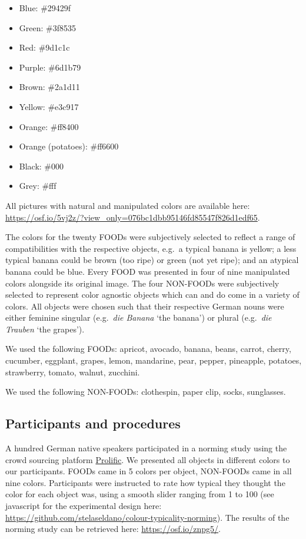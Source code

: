 \documentclass[
  12pt,
]{article}
\providecommand{\tightlist}{%
  \setlength{\itemsep}{0pt}\setlength{\parskip}{0pt}}
\begin{document}
\begin{itemize}
\tightlist
\item
  Blue: \#29429f
\item
  Green: \#3f8535
\item
  Red: \#9d1c1c
\item
  Purple: \#6d1b79
\item
  Brown: \#2a1d11
\item
  Yellow: \#e3c917
\item
  Orange: \#ff8400
\item
  Orange (potatoes): \#ff6600
\item
  Black: \#000
\item
  Grey: \#fff
\end{itemize}

All pictures with natural and manipulated colors are available here: \url{https://osf.io/5vj2z/?view_only=076bc1dbb95146fd85547f826d1edf65}.

The colors for the twenty FOODs were subjectively selected to reflect a range of compatibilities with the respective objects, e.g.~a typical banana is yellow; a less typical banana could be brown (too ripe) or green (not yet ripe); and an atypical banana could be blue.
Every FOOD was presented in four of nine manipulated colors alongside its original image.
The four NON-FOODs were subjectively selected to represent color agnostic objects which can and do come in a variety of colors.
All objects were chosen such that their respective German nouns were either feminine singular (e.g.~\emph{die Banana} `the banana') or plural (e.g.~\emph{die Trauben} `the grapes').

We used the following FOODs: apricot, avocado, banana, beans, carrot, cherry, cucumber, eggplant, grapes, lemon, mandarine, pear, pepper, pineapple, potatoes, strawberry, tomato, walnut, zucchini.

We used the following NON-FOODs: clothespin, paper clip, socks, sunglasses.

\hypertarget{participants-and-procedures}{%
\subsection{Participants and procedures}\label{participants-and-procedures}}

A hundred German native speakers participated in a norming study using the crowd sourcing platform \href{https://www.prolific.ac}{Prolific}.
We presented all objects in different colors to our participants.
FOODs came in 5 colors per object, NON-FOODs came in all nine colors.
Participants were instructed to rate how typical they thought the color for each object was, using a smooth slider ranging from 1 to 100 (see javascript for the experimental design here: \url{https://github.com/stelaseldano/colour-typicality-norming}).
The results of the norming study can be retrieved here: \url{https://osf.io/znpg5/}.
\end{document}
